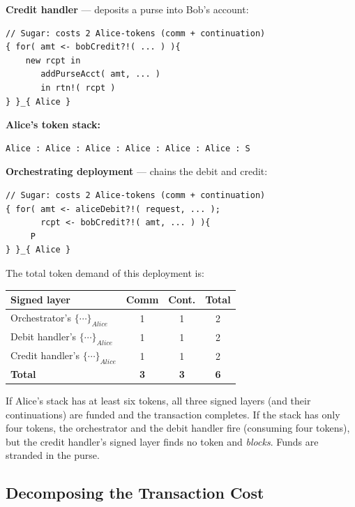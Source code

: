\documentclass[11pt,a4paper]{article}
\newcommand{\signed}[2]{\{#1\}_{#2}}
\begin{document}
\noindent
\textbf{Credit handler} --- deposits a purse into Bob's
account:
\begin{lstlisting}[style=rholang]
// Sugar: costs 2 Alice-tokens (comm + continuation)
{ for( amt <- bobCredit?!( ... ) ){
    new rcpt in
       addPurseAcct( amt, ... )
       in rtn!( rcpt )
} }_{ Alice }
\end{lstlisting}

\noindent
\textbf{Alice's token stack:}
\begin{lstlisting}[style=rholang]
Alice : Alice : Alice : Alice : Alice : Alice : S
\end{lstlisting}

\noindent
\textbf{Orchestrating deployment} --- chains the debit and
credit:
\begin{lstlisting}[style=rholang]
// Sugar: costs 2 Alice-tokens (comm + continuation)
{ for( amt <- aliceDebit?!( request, ... );
       rcpt <- bobCredit?!( amt, ... ) ){
     P
} }_{ Alice }
\end{lstlisting}

\noindent
The total token demand of this deployment is:
\begin{center}
  \begin{tabular}{lccc}
    \textbf{Signed layer}
      & \textbf{Comm}
      & \textbf{Cont.}
      & \textbf{Total} \\
    \midrule
    Orchestrator's $\signed{\cdots}{\mathit{Alice}}$
      & 1 & 1 & 2 \\
    Debit handler's $\signed{\cdots}{\mathit{Alice}}$
      & 1 & 1 & 2 \\
    Credit handler's $\signed{\cdots}{\mathit{Alice}}$
      & 1 & 1 & 2 \\
    \midrule
    \textbf{Total} & \textbf{3} & \textbf{3} & \textbf{6} \\
  \end{tabular}
\end{center}

\noindent
If Alice's stack has at least six tokens, all three
signed layers (and their continuations) are funded and the
transaction completes.  If the stack has only four tokens,
the orchestrator and the debit handler fire (consuming
four tokens), but the credit handler's signed layer finds
no token and \emph{blocks}.
Funds are stranded in the purse.

\subsection{Decomposing the Transaction Cost}
\label{sec:txn-cost-decomp}
\end{document}
